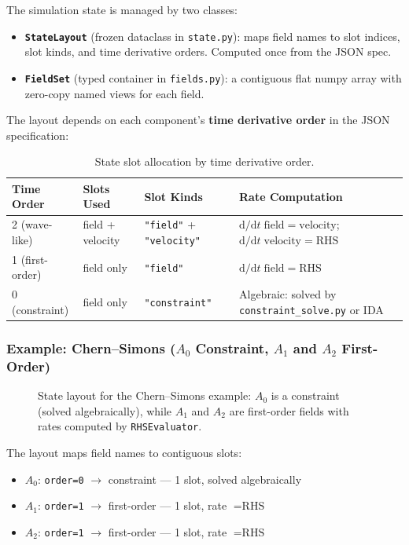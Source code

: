 The simulation state is managed by two classes:

\begin{itemize}
  \item \textbf{\texttt{StateLayout}} (frozen dataclass in \texttt{state.py}): maps field names to slot indices, slot kinds, and time derivative orders. Computed once from the JSON spec.
  \item \textbf{\texttt{FieldSet}} (typed container in \texttt{fields.py}): a contiguous flat numpy array with zero-copy named views for each field.
\end{itemize}

The layout depends on each component's \textbf{time derivative order} in the JSON specification:

\begin{table}[htbp]
\centering
\caption{State slot allocation by time derivative order.}
\label{tab:state-slots}
\begin{tabular}{@{}llll@{}}
\toprule
Time Order & Slots Used & Slot Kinds & Rate Computation \\
\midrule
2 (wave-like) & field + velocity & \texttt{"field"} + \texttt{"velocity"} & $\mathrm{d}/\mathrm{d}t\;\text{field} = \text{velocity}$; $\mathrm{d}/\mathrm{d}t\;\text{velocity} = \text{RHS}$ \\
1 (first-order) & field only & \texttt{"field"} & $\mathrm{d}/\mathrm{d}t\;\text{field} = \text{RHS}$ \\
0 (constraint) & field only & \texttt{"constraint"} & Algebraic: solved by \texttt{constraint\_solve.py} or IDA \\
\bottomrule
\end{tabular}
\end{table}

\subsubsection{Example: Chern--Simons ($A_0$ Constraint, $A_1$ and $A_2$ First-Order)}
\label{sec:state-example-cs}

\begin{figure}[htbp]
\centering

\caption{State layout for the Chern--Simons example: $A_0$ is a constraint (solved algebraically), while $A_1$ and $A_2$ are first-order fields with rates computed by \texttt{RHSEvaluator}.}
\label{fig:state-layout}
\end{figure}

The layout maps field names to contiguous slots:
\begin{itemize}
  \item $A_0$: \texttt{order=0} $\to$ constraint --- 1 slot, solved algebraically
  \item $A_1$: \texttt{order=1} $\to$ first-order --- 1 slot, rate $= \text{RHS}$
  \item $A_2$: \texttt{order=1} $\to$ first-order --- 1 slot, rate $= \text{RHS}$
\end{itemize}

